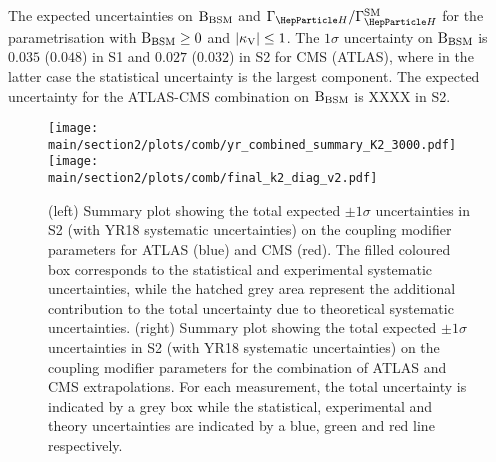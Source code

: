 The expected uncertainties on $\mathrm{B_{BSM}}$ and $\GammaSM$ for the parametrisation with $\mathrm{B_{BSM}}\geq0$ and $|\kappa_{\mathrm{V}}|\leq1$. The $1\sigma$ uncertainty on $\mathrm{B_{BSM}}$ is $0.035$ ($0.048$) in S1 and $0.027$ ($0.032$) in S2 for CMS (ATLAS), where in the latter case the statistical uncertainty is the largest component.
The expected uncertainty for the ATLAS-CMS combination on  $\mathrm{B_{BSM}}$ is XXXX in S2. 

\begin{figure}[hbtp]
\centering
\texttt{[image: \\main/section2/plots/comb/yr\_combined\_summary\_K2\_3000.pdf]}%
\texttt{[image: \\main/section2/plots/comb/final\_k2\_diag\_v2.pdf]}%
\caption{(left) Summary plot showing the total expected $\pm 1\sigma$ uncertainties in S2 (with YR18 systematic uncertainties) on the coupling modifier parameters   for ATLAS (blue)  and CMS (red). The filled coloured box corresponds to the statistical and experimental systematic uncertainties, while the hatched grey area represent the additional contribution to the total uncertainty due to theoretical systematic uncertainties.
(right) Summary plot showing the total expected $\pm 1\sigma$  uncertainties in S2 (with YR18 systematic uncertainties) on the coupling modifier parameters for the combination of ATLAS and CMS extrapolations. For each measurement,  the total uncertainty is indicated by a grey box while the statistical, experimental and theory uncertainties are indicated by a blue, green and red line respectively.}
\label{fig:summary_K2}
\end{figure}


\begin{table}[hbtp]
\centering
\caption{The expected $\pm 1\sigma$ uncertainties, expressed as percentages, on the coupling modifier parameters.%
Values are given for both S1 (with Run~2 systematic uncertainties~\cite{Sirunyan:2018koj}) and S2 (with YR18 systematic uncertainties). The total uncertainty is decomposed into four components: statistical (Stat), signal theory (SigTh), background theory (BkgTh) and experimental (Exp).}
\small
\hspace{0.5cm}

\label{tab:summary_K2}
\vspace{0.5cm}
\end{table}

